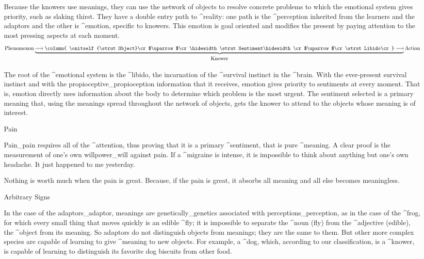 Because the knowers use meanings, they can use the network of objects to
resolve concrete problems to which the emotional system gives priority,
such as slaking thirst. They have a double entry path to ^{reality}: one
path is the ^{perception} inherited from the learners and the adaptors
and the other is ^{emotion}, specific to knowers. This emotion is goal
oriented and modifies the present by paying attention to the most
pressing aspects at each moment.
$$\hbox{Phenomenon}
   \underbrace{
    \longrightarrow
    \column{
     \onitself{\strut Object}\cr
     $\uparrow$\cr
     \hidewidth\strut Sentiment\hidewidth\cr
     $\uparrow$\cr
     \strut Libido\cr}
    \longrightarrow}_{\strut\hbox{Knower}}
  \hbox{Action}
$$

The root of the ^{emotional system} is the ^{libido}, the incarnation of
the ^{survival instinct} in the ^{brain}. With the ever-present survival
instinct and with the propioceptive_{propioception} information that it
receives, emotion gives priority to sentiments at every moment. That is,
emotion directly uses information about the body to determine which
problem is the most urgent. The sentiment selected is a primary meaning
that, using the meanings spread throughout the network of objects, gets
the knower to attend to the objects whose meaning is of interest.


\Section Pain

Pain_{pain} requires all of the ^{attention}, thus proving that it is a
primary ^{sentiment}, that  is pure ^{meaning}. A clear
proof is the measurement of one's own willpower_{will} against pain. If
a ^{migraine} is intense, it is impossible to think about anything but
one's own headache. It just happened to me yesterday. %

Nothing is worth much when the pain is great. Because, if the pain is
great, it absorbs all meaning and all else becomes meaningless.


\Section Arbitrary Signs

In the case of the adaptors_{adaptor}, meanings are
genetically_{genetics} associated with perceptions_{perception}, as in
the case of the ^{frog}, for which every small thing that moves quickly
is an edible ^{fly}; it is impossible to separate the ^{noun} (fly) from
the ^{adjective} (edible), the ^{object} from its meaning. So adaptors
do not distinguish objects from meanings; they are the same to them. But
other more complex species are capable of learning to give ^{meaning} to
new objects. For example, a ^{dog}, which, according to our
classification, is a ^{knower}, is capable of learning to distinguish
its favorite dog biscuits from other food.

